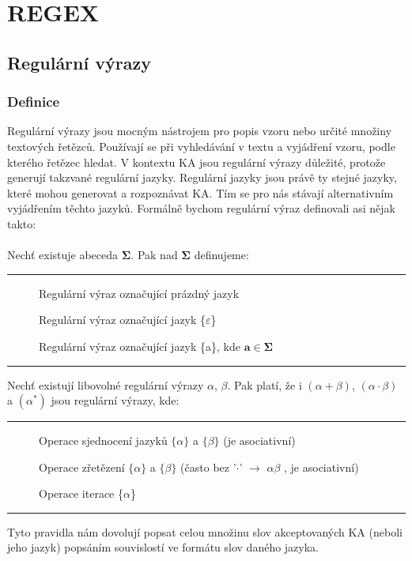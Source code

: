 \documentclass{report}
\begin{document}
\setcounter{chapter}{3}
\setcounter{section}{0}
\chapter*{REGEX}
\section{Regulární výrazy}
\subsection*{Definice}
Regulární výrazy jsou mocným nástrojem pro popis vzoru nebo určité množiny textových řetězců. Používají se při vyhledávání v textu a vyjádření vzoru, podle kterého řetězec hledat. V kontextu KA jsou regulární výrazy důležité, protože generují takzvané regulární jazyky. Regulární jazyky jsou právě ty stejné jazyky, které mohou generovat a rozpoznávat KA. Tím se pro nás stávají alternativním vyjádřením těchto jazyků. Formálně bychom regulární výraz definovali asi nějak takto:
\\ \\
Nechť existuje abeceda $\mathbf{\Sigma}$. Pak nad $\mathbf{\Sigma}$ definujeme: 
\vspace{0.4cm}    
\hrule
\vspace{0.1cm}
\begin{description}
    \item[\fbox{$\mathbf{\theta}$}] Regulární výraz označující prázdný jazyk
    \item[\fbox{$\varepsilon$}] Regulární výraz označující jazyk \{$\varepsilon$\}
    \item[] Regulární výraz označující jazyk \{a\}, kde  $\mathbf{a \in \Sigma}$
\end{description}
\vspace{0.1cm}    
\hrule
\vspace{0.4cm}
Nechť existují libovolné regulární výrazy $\alpha$, $\beta$. Pak platí, že i $(\alpha + \beta)$, $(\alpha \cdot \beta)$ a $(\alpha^*)$ jsou regulární výrazy, kde:
\vspace{0.4cm}    
\hrule
\vspace{0.1cm}
\begin{description}
    \item[\fbox{$(\alpha + \beta)$}] Operace sjednocení jazyků $\{\alpha\}$ a $\{\beta\}$ (je asociativní)  \item[\fbox{$(\alpha \cdot \beta)$}] Operace zřetězení $\{\alpha\}$ a $\{\beta\}$ (často bez '$\cdot$' $\rightarrow$ $\alpha\beta$ , je asociativní) 
    \item[\fbox{$(\alpha^*)$}] Operace iterace \{$\alpha$\}
\end{description}
\vspace{0.1cm}    
\hrule
\vspace{0.4cm}
Tyto pravidla nám dovolují popsat celou množinu slov akceptovaných KA (neboli jeho jazyk) popsáním souvislostí ve formátu slov daného jazyka.
\end{document}
